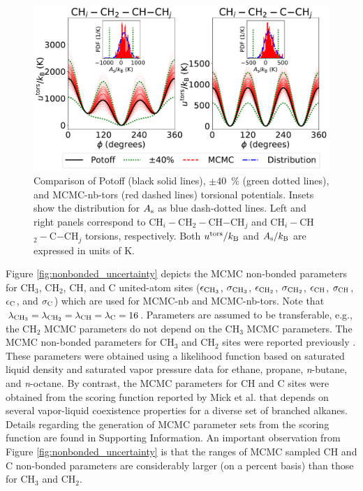 \documentclass[preprint,review,12pt]{elsarticle}
\begin{document}
	\begin{figure}[htb!]
		\centering
		\includegraphics[width=6.4in]{MCMC_torsions.pdf}
		\caption{Comparison of Potoff (black solid lines), $\pm 40$~\% (green dotted lines), and MCMC-nb-tors (red dashed lines) torsional potentials. Insets show the distribution for $A_{\rm s}$ as blue dash-dotted lines. Left and right panels correspond to CH$_i-$CH$_2-$CH$-$CH$_j$ and CH$_i-$CH$_2-$C$-$CH$_j$ torsions, respectively. Both $u^{\rm tors}/k_{\rm B}$ and $A_{\rm s}/k_{\rm B}$ are expressed in units of K.}
		\label{fig:dihedral_uncertainty}
	\end{figure}

	Figure \ref{fig:nonbonded_uncertainty} depicts the MCMC non-bonded parameters for CH$_3$, CH$_2$, CH, and C united-atom sites ($\epsilon_{\rm CH_3}$, $\sigma_{\rm CH_3}$, $\epsilon_{\rm CH_2}$, $\sigma_{\rm CH_2}$, $\epsilon_{\rm CH}$, $\sigma_{\rm CH}$, $\epsilon_{\rm C}$, and $\sigma_{\rm C}$) which are used for MCMC-nb and MCMC-nb-tors. Note that $\lambda_{\rm CH_3} = \lambda_{\rm CH_2} = \lambda_{\rm CH} = \lambda_{\rm C} = 16$. Parameters are assumed to be transferable, e.g., the CH$_2$ MCMC parameters do not depend on the CH$_3$ MCMC parameters. The MCMC non-bonded parameters for CH$_3$ and CH$_2$ sites were reported previously \cite{Postdoc_2}. These parameters were obtained using a likelihood function based on saturated liquid density and saturated vapor pressure data for ethane, propane, \textit{n}-butane, and \textit{n}-octane. By contrast, the MCMC parameters for CH and C sites were obtained from the scoring function reported by Mick et al. \cite{Potoff_branched} that depends on several vapor-liquid coexistence properties for a diverse set of branched alkanes. Details regarding the generation of MCMC parameter sets from the scoring function are found in Supporting Information. An important observation from Figure \ref{fig:nonbonded_uncertainty} is that the ranges of MCMC sampled CH and C non-bonded parameters are considerably larger (on a percent basis) than those for CH$_3$ and CH$_2$.
	
\end{document}
